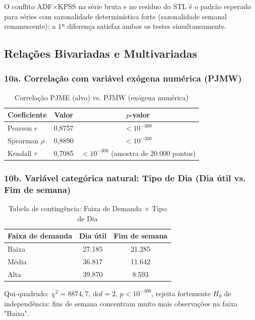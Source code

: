 \documentclass[12pt,a4paper]{article}
\begin{document}
\noindent O conflito ADF$\times$KPSS na série bruta e no resíduo do STL é o padrão esperado para séries com sazonalidade determinística forte (sazonalidade semanal remanescente); a 1ª diferença satisfaz ambos os testes simultaneamente.

\subsection{Relações Bivariadas e Multivariadas}

\subsubsection*{10a. Correlação com variável exógena numérica (PJMW)}

\begin{table}[H]
\centering
\caption{Correlação PJME (alvo) vs. PJMW (exógena numérica)}
\begin{tabular}{lcc}
\toprule
Coeficiente & Valor & $p$-valor \\
\midrule
Pearson $r$    & 0{,}8757 & $<10^{-300}$ \\
Spearman $\rho$ & 0{,}8890 & $<10^{-300}$ \\
Kendall $\tau$  & 0{,}7085 & $<10^{-300}$ (amostra de 20.000 pontos) \\
\bottomrule
\end{tabular}
\end{table}

\subsubsection*{10b. Variável categórica natural: Tipo de Dia (Dia útil vs. Fim de semana)}

\begin{table}[H]
\centering
\caption{Tabela de contingência: Faixa de Demanda $\times$ Tipo de Dia}
\begin{tabular}{lcc}
\toprule
Faixa de demanda & Dia útil & Fim de semana \\
\midrule
Baixa  & 27.185 & 21.285 \\
Média  & 36.817 & 11.642 \\
Alta   & 39.870 &  8.593 \\
\bottomrule
\end{tabular}
\end{table}

\noindent Qui-quadrado: $\chi^2=8874{,}7$, $\text{dof}=2$, $p<10^{-300}$, rejeita fortemente $H_0$ de independência: fins de semana concentram muito mais observações na faixa "Baixa".
\end{document}
